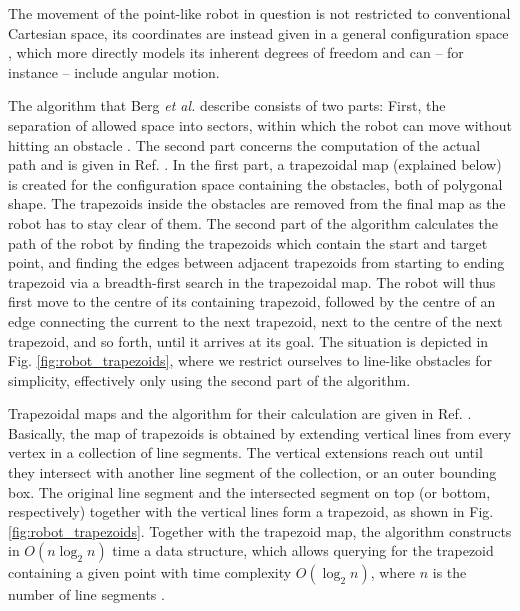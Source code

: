 The movement of the point-like robot in question is not restricted to conventional 
Cartesian space, its coordinates are instead given in a general configuration space
\cite[Ch. 13.1, pp. 284-286]{Berg2008} \cite{Choset2010_ch3}, which more directly 
models its inherent degrees of freedom and can -- for instance -- include angular motion.

The algorithm that Berg \textit{et al.} describe consists of two parts: 
First, the separation of allowed space into sectors, within which the robot can 
move without hitting an obstacle \cite[p. 286]{Berg2008}. 
The second part concerns the computation of the actual path and is given in 
Ref. \cite[p. 289]{Berg2008}. 
In the first part, a trapezoidal map (explained below) is created for the 
configuration space containing the obstacles, both of polygonal shape. 
The trapezoids inside the obstacles are removed from the final map as the robot 
has to stay clear of them. 
The second part of the algorithm calculates the path of the robot by finding 
the trapezoids which contain the start and target point, and finding the edges 
between adjacent trapezoids from starting to ending trapezoid via a breadth-first 
search in the trapezoidal map. The robot will thus first move to the centre of 
its containing trapezoid, followed by the centre of an edge connecting the current 
to the next trapezoid, next to the centre of the next trapezoid, and so forth, 
until it arrives at its goal. 
The situation is depicted in Fig. \ref{fig:robot_trapezoids}, where we restrict 
ourselves to line-like obstacles for simplicity, effectively only using the 
second part of the algorithm.

Trapezoidal maps and the algorithm for their calculation are given in Ref. 
\cite[Ch. 6, pp. 121-146]{Berg2008}. Basically, the map of trapezoids is obtained 
by extending vertical lines from every vertex in a collection of line segments. 
The vertical extensions reach out until they intersect with another line segment 
of the collection, or an outer bounding box. The original line segment and the 
intersected segment on top (or bottom, respectively) together with the vertical 
lines form a trapezoid, as shown in Fig. \ref{fig:robot_trapezoids}. 
Together with the trapezoid map, the algorithm constructs in 
$O \left(n \log_{2} n \right)$ time a data structure, which allows querying for 
the trapezoid containing a given point with time complexity $O \left( \log_{2} n \right)$, 
where $n$ is the number of line segments \cite[Theorem 6.3, p. 133]{Berg2008}.

